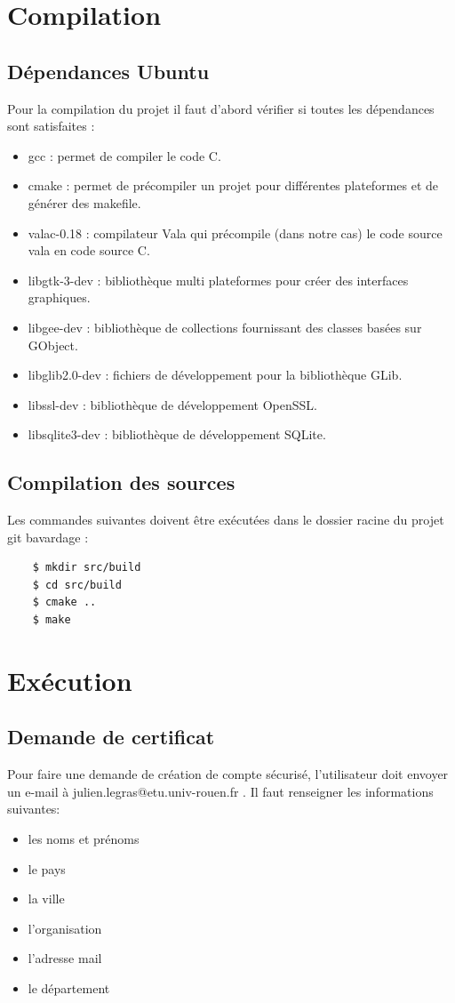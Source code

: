 \documentclass[a4paper,11pt,french]{book}
\begin{document}
\section{Compilation}
\subsection{Dépendances Ubuntu}
Pour la compilation du projet il faut d'abord vérifier si toutes les dépendances sont satisfaites :
\begin{itemize}
\item gcc : permet de compiler le code C.
\item cmake : permet de précompiler un projet pour différentes plateformes et de générer des makefile.
\item valac-0.18 : compilateur Vala qui précompile (dans notre cas) le code source vala en code source C.
\item libgtk-3-dev : bibliothèque multi plateformes pour créer des interfaces graphiques.
\item libgee-dev : bibliothèque de collections fournissant des classes basées sur GObject.
\item libglib2.0-dev : fichiers de développement pour la bibliothèque GLib.
\item libssl-dev : bibliothèque de développement OpenSSL.
\item libsqlite3-dev : bibliothèque de développement SQLite.
\end{itemize}

\subsection{Compilation des sources}

Les commandes suivantes doivent être exécutées dans le dossier racine du projet git bavardage : 
\begin{verbatim}
    $ mkdir src/build 
    $ cd src/build 
    $ cmake .. 
    $ make
\end{verbatim}

\section{Exécution}

\subsection{Demande de certificat}

Pour faire une demande de création de compte sécurisé, l'utilisateur doit envoyer un e-mail à julien.legras@etu.univ-rouen.fr . Il faut renseigner les informations suivantes:
\begin{itemize}
\item les noms et prénoms
\item le pays
\item la ville
\item l'organisation
\item l'adresse mail
\item le département
\end{itemize}
\end{document}
